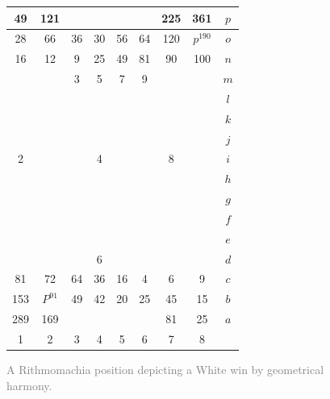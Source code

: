 \documentclass[12pt]{article}
\begin{document}
\begin{figure}[h!] 
\centering 
\begin{tabular}{|c|c|c|c|c|c|c|c||c} \hline
\squadfill{\,}49 & \squadfill{\,}121 & \quad  & \quad  & \quad  & \quad  & \squadfill{\,}225 & \squadfill{\,}361 & $p$ \\ \hline
\squadfill{\,}28 & \squadfill{\,}66 & \trianglepafill{\,}36 & \trianglepafill{\,}30 & \trianglepafill{\,}56 & \trianglepafill{\,}64 & \squadfill{\,}120 & \rhombusfill{\,}$p^{190}$ & $o$ \\ \hline
\trianglepafill{\,}16 & \trianglepafill{\,}12 & \circletfill{\,}9 & \circletfill{\,}25 & \circletfill{\,}49 & \circletfill{\,}81 & \trianglepafill{\,}90 & \trianglepafill{\,}100 & $n$ \\ \hline
\quad  & \quad  & \circletfill{\,}3 & \circletfill{\,}5 & \circletfill{\,}7 & \circletfill{\,}9 & \quad  & \quad  & $m$ \\ \hline
\quad  & \quad  & \quad  & \quad  & \quad  & \quad  & \quad  & \quad  & $l$ \\ \hline
\quad  & \quad  & \quad  & \quad  & \quad  & \quad  & \quad  & \quad  & $k$ \\ \hline
\quad  & \quad  & \quad  & \quad  & \quad  & \quad  & \quad  & \quad  & $j$ \\ \hline
\circlet{\,}2 & \quad  & \quad  & \circlet{\,}4 & \quad  & \quad  & \circlet{\,}8 & \quad  & $i$ \\ \hline
\quad  & \quad  & \quad  & \quad  & \quad  & \quad  & \quad  & \quad  & $h$ \\ \hline
\quad  & \quad  & \quad  & \quad  & \quad  & \quad  & \quad  & \quad  & $g$ \\ \hline
\quad  & \quad  & \quad  & \quad  & \quad  & \quad  & \quad  & \quad  & $f$ \\ \hline
\quad  & \quad  & \quad  & \quad  & \quad  & \quad  & \quad  & \quad  & $e$ \\ \hline
\quad  & \quad  & \quad  & \circlet{\,}6 & \quad  & \quad  & \quad  & \quad  & $d$ \\ \hline
\trianglepa{\,}81 & \trianglepa{\,}72 & \circlet{\,}64 & \circlet{\,}36 & \circlet{\,}16 & \circlet{\,}4 & \trianglepa{\,}6 & \trianglepa{\,}9 & $c$ \\ \hline
\squad{\,}153 & \rhombus{\,}$P^{91}$ & \trianglepa{\,}49 & \trianglepa{\,}42 & \trianglepa{\,}20 & \trianglepa{\,}25 & \squad{\,}45 & \squad{\,}15 & $b$ \\ \hline
\squad{\,}289 & \squad{\,}169 & \quad  & \quad  & \quad  & \quad  & \squad{\,}81 & \squad{\,}25 & $a$ \\ \hline
1 &  2 &  3 &  4 &  5 &  6 &  7 &  8  &  \\
\end{tabular} 
\caption{\textcolor{gray}{A Rithmomachia position depicting a White win by geometrical harmony.}}
\label{fig:rithmomachia-white-win-geometrical-harmony2} 
\end{figure}
\end{document}
